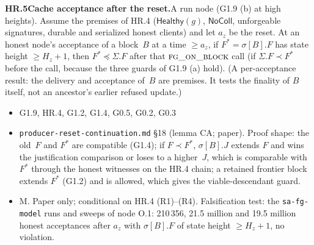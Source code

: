 \documentclass{article}
\newcommand{\fname}[1]{\text{\textsc{#1}}}
\newcommand{\dagnode}[6]{%
\par\medskip\noindent\textbf{#1\enspace #2.}\enspace #3
\begin{itemize}[leftmargin=2.2em,itemsep=0pt,topsep=2pt]
\item[\emph{Uses}] #4
\item[\emph{Evid.}] #5
\item[\emph{Task}] #6
\end{itemize}}
\begin{document}
\dagnode{HR.5}{Cache acceptance after the reset}{A run node (G1.9 (b) at
high heights).  Assume the premises of HR.4 ($\mathsf{Healthy}(g)$,
$\mathsf{NoColl}$, unforgeable signatures, durable and serialized honest
clients) and let $a_z$ be the reset.  At an honest node's acceptance of a block~$B$
at a time $\geq a_z$, if $F^*=\sigma[B].F$ has state height $\geq H_z+1$, then
$F^*\preceq\Sigma.F$ after that $\fname{fg\_on\_block}$ call (if $\Sigma.F\prec F^*$
before the call, because the three guards of G1.9 (a) hold).  (A per-acceptance result: the delivery and acceptance
of~$B$ are premises.  It tests the finality of $B$ itself, not an ancestor's
earlier refused update.)}
{G1.9, HR.4, G1.2, G1.4, G0.5, G0.2, G0.3}
{\texttt{producer-reset-continuation.md} \S18 (lemma CA; paper).  Proof shape:
the old~$F$ and $F^*$ are compatible (G1.4); if $F\prec F^*$, $\sigma[B].J$
extends $F$ and wins the justification comparison or loses to a higher~$J$,
which is comparable with $F^*$ through the honest witnesses on the HR.4 chain;
a retained frontier block extends $F^*$ (G1.2) and is allowed, which gives the
viable-descendant guard.}
{M.  Paper only; conditional on HR.4 (R1)--(R4).  Falsification test: the
\texttt{sa-fg-model} runs and sweeps of node O.1: 210\,356, 21.5 million and
19.5 million honest acceptances after $a_z$ with $\sigma[B].F$ of state height $\geq H_z+1$,
no violation.}
\end{document}
